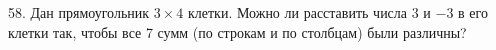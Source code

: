 58. Дан прямоугольник $3 \times 4$ клетки. Можно ли расставить числа $3$ и $-3$ в его клетки так, чтобы все 7 сумм (по строкам и по столбцам) были различны?\\
